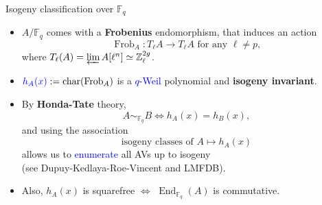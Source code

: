 \documentclass[usenames,dvipsnames,handout]{beamer}
\def\Q{\mathbb{Q}}
\def\Z{\mathbb{Z}}
\def\C{\mathbb{C}}
\def\F{\mathbb{F}}
\DeclareMathOperator{\Char}{char}
\DeclareMathOperator{\Frob}{Frob}
\DeclareMathOperator{\End}{End}
\newcommand{\cA}{{\mathcal A}}
\newcommand{\downmapsto}{\rotatebox[origin=c]{-90}{$\large\mapsto$}\mkern2mu} %
\newcommand{\set}[1]{\left\lbrace#1\right\rbrace }
\newcommand{\blue}[1]{\textcolor{blue}{#1}}
\begin{document}
\begin{frame}{ Isogeny classification over $\F_q$}
	\begin{itemize}
    \item $A/\F_{q}$ comes with a {\bf Frobenius} endomorphism, 
\pause
    that induces an action
		\[ \Frob_A : T_\ell A \rightarrow T_\ell A \text{ for any }\ell\neq p, \]
		where $T_\ell(A) = \varprojlim A[\ell^n] \simeq \Z_\ell^{2g}$.
\pause 
    \item $\blue{h_A(x)}:=\Char(\Frob_A)$ is a \blue{$q$-Weil} polynomial and {\bf isogeny invariant}.
\pause
    \item By {\bf Honda-Tate} theory,     
    \[ A\sim_{\F_q} B \Longleftrightarrow h_A(x)=h_B(x), \]
    and using the association
    \[ \text{isogeny classes of }A \longmapsto h_A(x) \]
    allows us to \blue{enumerate} all AVs up to isogeny\\
    (see Dupuy-Kedlaya-Roe-Vincent and LMFDB).
\pause
    \item Also, $h_A(x)$ is squarefree $\iff$ $\End_{\F_q}(A)$ is commutative.
	\end{itemize}
\end{frame}

\end{document}
